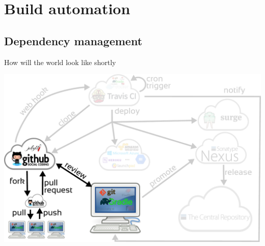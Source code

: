\documentclass[presentation]{beamer}
\begin{document}
\section{Build automation}

\subsection{Dependency management}

\begin{frame}[fragile]{How will the world look like shortly}
	\begin{center}
		\includegraphics[width=.9\textwidth]{images/ci-gradle}
	\end{center}
\end{frame}
\end{document}
